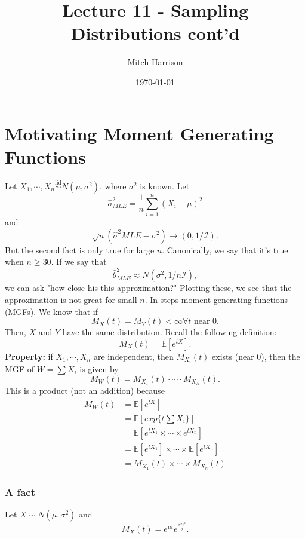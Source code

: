 \documentclass[titlepage, 12pt, leqno]{article}
\title{\Huge{Lecture 11 - Sampling Distributions cont'd}}
\author{\large{Mitch Harrison}}
\date{\today}
\begin{document}
\setlength{\parskip}{1\baselineskip}
\setlength{\parindent}{15pt}
\maketitle
\tableofcontents
\newpage


\section{Motivating Moment Generating Functions}

Let $X_{1}, \cdots ,X_{n} \overset{\mathrm{iid}}{\sim}N(\mu, \sigma^{2})$, where
$\sigma^{2}$ is known. Let
\[
\hat \sigma^{2}_{MLE} = \frac{1}{n}\sum_{i=1}^{n}(X_{i}-\mu)^{2}
\]
and
\[
\sqrt{n}(\hat \sigma^{2}{MLE}-\sigma^{2}) \rightarrow (0, 1/\mathcal{I}).
\]
But the second fact is only true for large $n$. Canonically, we say that it's
true when $n \ge 30$. If we say that
\[
\hat \theta_{MLE}^{2} \approx N(\sigma^{2},1/n\mathcal{I}),
\]
we can ask "how close his this approximation?" Plotting these, we see that the
approximation is not great for small $n$. In steps moment generating functions
(MGFs). We know that if
\[
M_{X}(t) = M_{Y}(t) < \infty \forall t \text{ near 0}.
\]
Then, $X$ and $Y$ have the same distribution. Recall the following definition:
\[
    M_{X}(t) = \mathbb{E}[e^{tX}].
\]
\textbf{Property:} if $X_{1}, \cdots ,X_{n}$ are independent, then $M_{X_{i}}(t)$
exists (near 0), then the MGF of $W = \sum X_{i}$ is given by
\[
M_{W}(t) = M_{X_{1}}(t) \cdot \cdots \cdot M_{X_{N}}(t).
\]
This is a product (not an addition) because
\begin{align*}
    M_{W}(t)
    &= \mathbb{E}[e^{tX}]\\
    &= \mathbb{E}[exp\{t \sum X_{i}\}] \\
    &= \mathbb{E}[e^{tX_{1}} \times \cdots \times e^{tX_{n}}] \\
    &= \mathbb{E}[e^{tX_{1}}] \times \cdots \times \mathbb{E}[e^{tX_{n}}] \\
    &= M_{X_{1}}(t) \times \cdots \times M_{X_{n}}(t)
\end{align*}

\subsubsection{A fact}
Let $X \sim N(\mu, \sigma^{2})$ and 
\[
    M_{X}(t) = e^{\mu t}e^{\frac{\sigma^{2}t^{2}}{2}}.
\]
\end{document}

